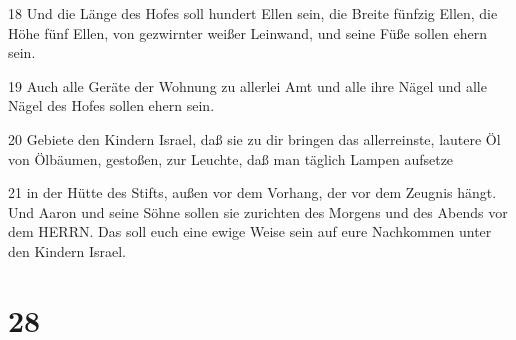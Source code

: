 \par 18 Und die Länge des Hofes soll hundert Ellen sein, die Breite fünfzig Ellen, die Höhe fünf Ellen, von gezwirnter weißer Leinwand, und seine Füße sollen ehern sein.
\par 19 Auch alle Geräte der Wohnung zu allerlei Amt und alle ihre Nägel und alle Nägel des Hofes sollen ehern sein.
\par 20 Gebiete den Kindern Israel, daß sie zu dir bringen das allerreinste, lautere Öl von Ölbäumen, gestoßen, zur Leuchte, daß man täglich Lampen aufsetze
\par 21 in der Hütte des Stifts, außen vor dem Vorhang, der vor dem Zeugnis hängt. Und Aaron und seine Söhne sollen sie zurichten des Morgens und des Abends vor dem HERRN. Das soll euch eine ewige Weise sein auf eure Nachkommen unter den Kindern Israel.

\chapter{28}

